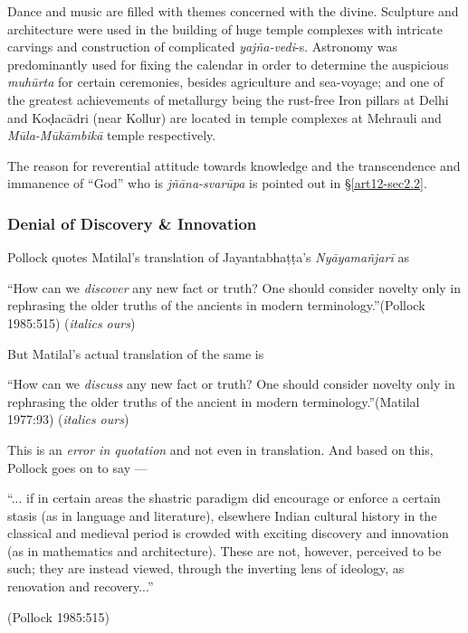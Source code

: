 Dance and music are ﬁlled with themes concerned with the divine. Sculpture and architecture were used in the building of huge temple complexes with intricate carvings and construction of complicated {\sl yajña-vedi}-s. Astronomy was predominantly used for ﬁxing the calendar in order to determine the auspicious {\sl muhūrta} for certain ceremonies, besides agriculture and sea-voyage; and one of the greatest achievements of metallurgy being the rust-free Iron pillars at Delhi and Koḍacādri (near Kollur) are located in temple complexes at Mehrauli and {\sl Mūla-Mūkāmbikā} temple respectively. 

The reason for reverential attitude towards knowledge and the transcendence and immanence of ``God'' who is {\sl jñāna-svarūpa} is pointed out in \S\ref{art12-sec2.2}.\\[-20pt]

\subsubsection{Denial of Discovery \& Innovation}\label{art12-sec3.8.2}

Pollock quotes Matilal's translation of Jayantabhaṭṭa's {\sl Nyāyamañjarī} as
\begin{myquote}
``How can we {\sl discover} any new fact or truth? One should consider novelty only in rephrasing the older truths of the ancients in modern terminology.''\hfill (Pollock 1985:515) ({\sl italics ours})
\end{myquote}

But Matilal's actual translation of the same is

\begin{myquote}
``How can we {\sl discuss} any new fact or truth? One should consider novelty only in rephrasing the older truths of the ancient in modern terminology.''\hfill (Matilal 1977:93) ({\sl italics ours})
\end{myquote}

This is an {\sl error in quotation}  and not even in translation. And based on this, Pollock goes on to say ---
\begin{myquote}
``... if in certain areas the shastric paradigm did encourage or enforce a certain stasis (as in language and literature), elsewhere Indian cultural history in the classical and medieval period is crowded with exciting discovery and innovation (as in mathematics and architecture). These are not, however, perceived to be such; they are instead viewed, through the inverting lens of ideology, as renovation and recovery...'' 

\hfill (Pollock 1985:515)
\end{myquote}

